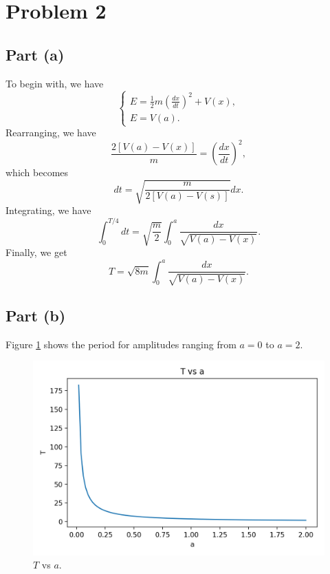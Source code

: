 \documentclass[11pt]{article}
\begin{document}
\section{Problem 2}
\subsection{Part (a)}
To begin with, we have
\begin{equation}
    \begin{cases}
        E = \frac{1}{2} m (\frac{dx}{dt})^2 + V(x), \\
        E = V(a).
    \end{cases}
\end{equation}
Rearranging, we have
\begin{equation}
    \frac{2[V(a) - V(x)]}{m} = (\frac{dx}{dt})^2,
\end{equation}
which becomes
\begin{equation}
    dt = \sqrt{\frac{m}{2[V(a) - V(s)]}} dx.
\end{equation}
Integrating, we have
\begin{equation}
    \int_0^{T/4} dt = \sqrt{\frac{m}{2}} \int_0^a \frac{dx}{\sqrt{V(a) - V(x)}}.
\end{equation}
Finally, we get
\begin{equation}
    T = \sqrt{8m} \int_0^a \frac{dx}{\sqrt{V(a) - V(x)}}.
\end{equation}

\subsection{Part (b)}
Figure \ref{fig:T-a} shows the period for amplitudes ranging from $a = 0$ to $a = 2$.
\begin{figure}[H]
    \centering
    \includegraphics[scale = 1.0]{images/ps-4-2b.png}
    \caption{$T$ vs $a$.}
    \label{fig:T-a}
\end{figure}
\end{document}
